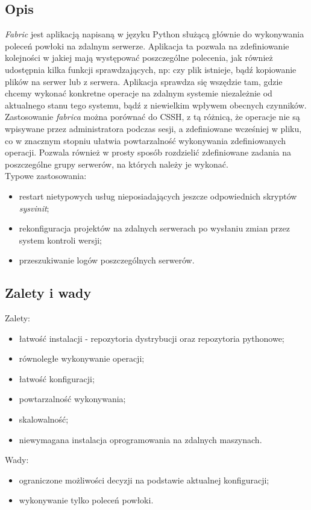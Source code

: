 \subsection{Opis}
\textit{Fabric} jest aplikacją napisaną w języku Python służącą głównie do wykonywania poleceń powłoki na zdalnym serwerze. Aplikacja ta pozwala na zdefiniowanie kolejności w jakiej mają występować poszczególne polecenia, jak również udostępnia kilka funkcji sprawdzających, np: czy plik istnieje, bądź kopiowanie plików na serwer lub z serwera.
Aplikacja sprawdza się wszędzie tam, gdzie chcemy wykonać konkretne operacje na zdalnym systemie niezależnie od aktualnego stanu tego systemu, bądź z niewielkim wpływem obecnych czynników.
Zastosowanie \textit{fabrica} można porównać do CSSH, z tą różnicą, że operacje nie są wpisywane przez administratora podczas sesji, a zdefiniowane wcześniej w pliku, co w znacznym stopniu ułatwia powtarzalność wykonywania zdefiniowanych operacji.
Pozwala również w prosty sposób rozdzielić zdefiniowane zadania na poszczególne grupy serwerów, na których należy je wykonać.\\
Typowe zastosowania:
\begin{itemize}
\item restart nietypowych usług nieposiadających jeszcze odpowiednich skryptów \textit{sysvinit};
\item rekonfiguracja projektów na zdalnych serwerach po wysłaniu zmian przez system kontroli wersji;
\item przeszukiwanie logów poszczególnych serwerów.
\end{itemize}
\subsection{Zalety i wady}
Zalety:
\begin{itemize}
\item łatwość instalacji - repozytoria dystrybucji oraz repozytoria pythonowe;
\item równoległe wykonywanie operacji;
\item łatwość konfiguracji;
\item powtarzalność wykonywania;
\item skalowalność;
\item niewymagana instalacja oprogramowania na zdalnych maszynach.
\end{itemize}
Wady:
\begin{itemize}
\item ograniczone możliwości decyzji na podstawie aktualnej konfiguracji;
\item wykonywanie tylko poleceń powłoki.
\end{itemize}
